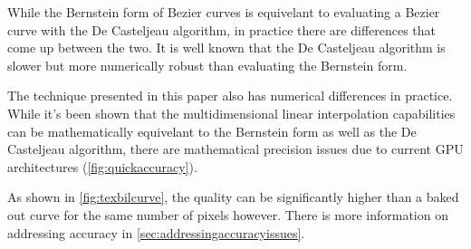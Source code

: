\documentclass{jcgt}
\begin{document}
While the Bernstein form of Bezier curves is equivelant to evaluating a Bezier curve with the De Casteljeau algorithm, in practice there are differences that come up between the two.  It is well known that the De Casteljeau algorithm is slower but more numerically robust than evaluating the Bernstein form.

The technique presented in this paper also has numerical differences in practice.  While it's been shown that the multidimensional linear interpolation capabilities can be mathematically equivelant to the Bernstein form as well as the De Casteljeau algorithm, there are mathematical precision issues due to current GPU architectures (\autoref{fig:quickaccuracy}).

As shown in \autoref{fig:texbilcurve}, the quality can be significantly higher than a baked out curve for the same number of pixels however.  There is more information on addressing accuracy in \autoref{sec:addressingaccuracyissues}.
\end{document}
